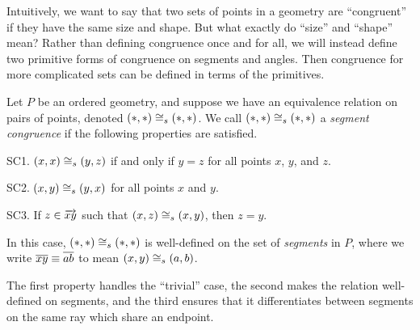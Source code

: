 Intuitively, we want to say that two sets of points in a geometry are ``congruent'' if they have the same size and shape.
But what exactly do ``size'' and ``shape'' mean?
Rather than defining congruence once and for all, we will instead define two primitive forms of congruence on segments and angles.
Then congruence for more complicated sets can be defined in terms of the primitives.

\begin{dfn}
Let \(P\) be an ordered geometry, and suppose we have an equivalence relation on pairs of points, denoted \((\ast,\ast) \cong_s (\ast,\ast)\).
We call \((\ast,\ast) \cong_s (\ast,\ast)\) a \emph{segment congruence} if the following properties are satisfied.
\begin{proplist}
\item[SC1.] \((x,x) \cong_s (y,z)\) if and only if \(y = z\) for all points \(x\), \(y\), and \(z\).
\item[SC2.] \((x,y) \cong_s (y,x)\) for all points \(x\) and \(y\).
\item[SC3.] If \(z \in \overrightarrow{xy}\) such that \((x,z) \cong_s (x,y)\), then \(z = y\).
\end{proplist}
In this case, \((\ast,\ast) \cong_s (\ast,\ast)\) is well-defined on the set of \emph{segments} in \(P\), where we write \(\overline{xy} \equiv \overline{ab}\) to mean \((x,y) \cong_s (a,b)\).
\end{dfn}

The first property handles the ``trivial'' case, the second makes the relation well-defined on segments, and the third ensures that it differentiates between segments on the same ray which share an endpoint.

